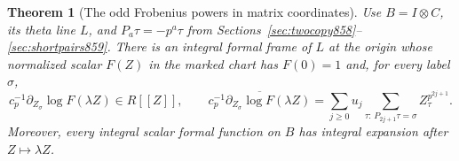 \documentclass[a4paper,11pt]{article}
\newtheorem{theorem}[proposition]{Theorem}
\theoremstyle{definition}
\theoremstyle{remark}
\numberwithin{equation}{section}
\begin{document}
\begin{theorem}[The odd Frobenius powers in matrix coordinates]
\leavevmode\label{thm:inertgradient860}
Use \(B=I\otimes C\), its theta line \(L\), and \(P_a\tau=-p^a\tau\)
from Sections~\ref{sec:twocopy858}--\ref{sec:shortpairs859}.
There is an integral formal frame of \(L\) at the origin
whose normalized scalar \(F(Z)\) in the marked chart has
\(F(0)=1\) and, for every label \(\sigma\),
\begin{equation}
 c_p^{-1}\partial_{Z_\sigma}\log F(\lambda Z)\in R[[Z]],
 \qquad
 \overline{c_p^{-1}\partial_{Z_\sigma}\log F(\lambda Z)}
    =\sum_{j\ge0}u_j
          \sum_{\tau:\,P_{2j+1}\tau=\sigma} Z_\tau^{p^{2j+1}} .
 \label{eq:inertgradient860}
\end{equation}
Moreover, every integral scalar formal function on \(B\)
has integral expansion after \(Z\mapsto\lambda Z\).
\end{theorem}
\end{document}
